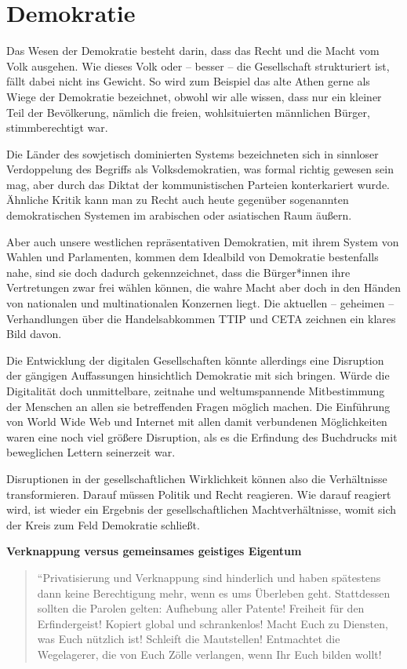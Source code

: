 \documentclass[a4paper,
fontsize=11pt,
oneside,
numbers=noperiodatend,
parskip=half-,
bibliography=totoc,
final
]{scrartcl}
\begin{document}
\hypertarget{demokratie}{%
\section*{Demokratie}\label{demokratie}}

Das Wesen der Demokratie besteht darin, dass das Recht und die Macht vom
Volk ausgehen. Wie dieses Volk oder -- besser -- die Gesellschaft
strukturiert ist, fällt dabei nicht ins Gewicht. So wird zum Beispiel
das alte Athen gerne als Wiege der Demokratie bezeichnet, obwohl wir
alle wissen, dass nur ein kleiner Teil der Bevölkerung, nämlich die
freien, wohlsituierten männlichen Bürger, stimmberechtigt war.

Die Länder des sowjetisch dominierten Systems bezeichneten sich in
sinnloser Verdoppelung des Begriffs als Volksdemokratien, was formal
richtig gewesen sein mag, aber durch das Diktat der kommunistischen
Parteien konterkariert wurde. Ähnliche Kritik kann man zu Recht auch
heute gegenüber sogenannten demokratischen Systemen im arabischen oder
asiatischen Raum äußern.

Aber auch unsere westlichen repräsentativen Demokratien, mit ihrem
System von Wahlen und Parlamenten, kommen dem Idealbild von Demokratie
bestenfalls nahe, sind sie doch dadurch gekennzeichnet, dass die
Bürger*innen ihre Vertretungen zwar frei wählen können, die wahre Macht
aber doch in den Händen von nationalen und multinationalen Konzernen
liegt. Die aktuellen -- geheimen -- Verhandlungen über die
Handelsabkommen TTIP und CETA zeichnen ein klares Bild davon.

Die Entwicklung der digitalen Gesellschaften könnte allerdings eine
Disruption der gängigen Auffassungen hinsichtlich Demokratie mit sich
bringen. Würde die Digitalität doch unmittelbare, zeitnahe und
weltumspannende Mitbestimmung der Menschen an allen sie betreffenden
Fragen möglich machen. Die Einführung von World Wide Web und Internet
mit allen damit verbundenen Möglichkeiten waren eine noch viel größere
Disruption, als es die Erfindung des Buchdrucks mit beweglichen Lettern
seinerzeit war.

Disruptionen in der gesellschaftlichen Wirklichkeit können also die
Verhältnisse transformieren. Darauf müssen Politik und Recht reagieren.
Wie darauf reagiert wird, ist wieder ein Ergebnis der gesellschaftlichen
Machtverhältnisse, womit sich der Kreis zum Feld Demokratie schließt.

\textbf{Verknappung versus gemeinsames geistiges Eigentum}

\begin{quote}
``Privatisierung und Verknappung sind hinderlich und haben spätestens
dann keine Berechtigung mehr, wenn es ums Überleben geht. Stattdessen
sollten die Parolen gelten: Aufhebung aller Patente! Freiheit für den
Erfindergeist! Kopiert global und schrankenlos! Macht Euch zu Diensten,
was Euch nützlich ist! Schleift die Mautstellen! Entmachtet die
Wegelagerer, die von Euch Zölle verlangen, wenn Ihr Euch bilden wollt!
\end{quote}
\end{document}
